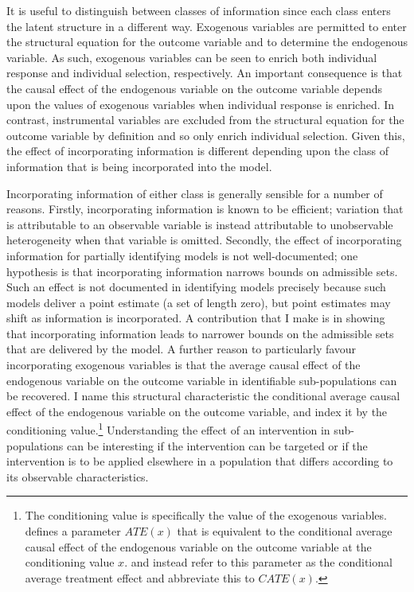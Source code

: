 \documentclass[10pt,a4paper,twoside]{article}
\numberwithin{equation}{section}
\begin{document}
It is useful to distinguish between classes of information since each class enters the latent structure in a different way. Exogenous variables are permitted to enter the structural equation for the outcome variable and to determine the endogenous variable. As such, exogenous variables can be seen to enrich both individual response and individual selection, respectively. An important consequence is that the causal effect of the endogenous variable on the outcome variable depends upon the values of exogenous variables when individual response is enriched. In contrast, instrumental variables are excluded from the structural equation for the outcome variable by definition and so only enrich individual selection. Given this, the effect of incorporating information is different depending upon the class of information that is being incorporated into the model.  

Incorporating information of either class is generally sensible for a number of reasons. Firstly, incorporating information is known to be efficient; variation that is attributable to an observable variable is instead attributable to unobservable heterogeneity when that variable is omitted. Secondly, the effect of incorporating information for partially identifying models is not well-documented; one hypothesis is that incorporating information narrows bounds on admissible sets. Such an effect is not documented in identifying models precisely because such models deliver a point estimate (a set of length zero), but point estimates may shift as information is incorporated. A contribution that I make is in showing that \color{red} incorporating information leads to narrower bounds on the admissible sets \color{black} that are delivered by the model. A further reason to particularly favour incorporating exogenous variables is that the average causal effect of the endogenous variable on the outcome variable in identifiable sub-populations can be recovered. I name this structural characteristic the conditional average causal effect of the endogenous variable on the outcome variable, and index it by the conditioning value.\footnote{The conditioning value is specifically the value of the exogenous variables. \cite{hEvY05} defines a parameter $ATE(x)$ that is equivalent to the conditional average causal effect of the endogenous variable on the outcome variable at the conditioning value $x$. \cite{kHt10} and \cite{13.misc.abrevaya} instead refer to this parameter as the conditional average treatment effect and abbreviate this to $CATE(x)$.} Understanding the effect of an intervention in sub-populations can be interesting if the intervention can be targeted or if the intervention is to be applied elsewhere in a population that differs according to its observable characteristics. 
\end{document}
